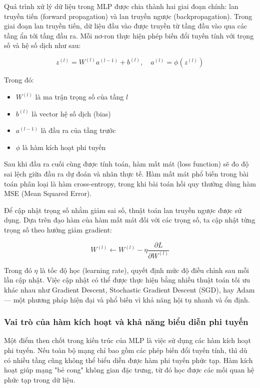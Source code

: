 Quá trình xử lý dữ liệu trong MLP được chia thành hai giai đoạn chính: lan truyền tiến (forward propagation) và lan truyền ngược (backpropagation). Trong giai đoạn lan truyền tiến, dữ liệu đầu vào được truyền từ tầng đầu vào qua các tầng ẩn tới tầng đầu ra. Mỗi nơ-ron thực hiện phép biến đổi tuyến tính với trọng số và hệ số dịch như sau:

\[
z^{(l)} = W^{(l)} a^{(l-1)} + b^{(l)}, \quad a^{(l)} = \phi(z^{(l)})
\]

Trong đó:
\begin{itemize}
	\item $W^{(l)}$ là ma trận trọng số của tầng $l$
	\item $b^{(l)}$ là vector hệ số dịch (bias)
	\item $a^{(l-1)}$ là đầu ra của tầng trước
	\item $\phi$ là hàm kích hoạt phi tuyến
\end{itemize}

Sau khi đầu ra cuối cùng được tính toán, hàm mất mát (loss function) sẽ đo độ sai lệch giữa đầu ra dự đoán và nhãn thực tế. Hàm mất mát phổ biến trong bài toán phân loại là hàm cross-entropy, trong khi bài toán hồi quy thường dùng hàm MSE (Mean Squared Error).

Để cập nhật trọng số nhằm giảm sai số, thuật toán lan truyền ngược được sử dụng. Dựa trên đạo hàm của hàm mất mát đối với các trọng số, ta cập nhật từng trọng số theo hướng giảm gradient:

\[
W^{(l)} \leftarrow W^{(l)} - \eta \frac{\partial L}{\partial W^{(l)}}
\]

Trong đó $\eta$ là tốc độ học (learning rate), quyết định mức độ điều chỉnh sau mỗi lần cập nhật. Việc cập nhật có thể được thực hiện bằng nhiều thuật toán tối ưu khác nhau như Gradient Descent, Stochastic Gradient Descent (SGD), hay Adam — một phương pháp hiện đại và phổ biến vì khả năng hội tụ nhanh và ổn định.

\subsubsection*{Vai trò của hàm kích hoạt và khả năng biểu diễn phi tuyến}

Một điểm then chốt trong kiến trúc của MLP là việc sử dụng các hàm kích hoạt phi tuyến. Nếu toàn bộ mạng chỉ bao gồm các phép biến đổi tuyến tính, thì dù có nhiều tầng cũng không thể biểu diễn được hàm phi tuyến phức tạp. Hàm kích hoạt giúp mạng "bẻ cong" không gian đặc trưng, từ đó học được các mối quan hệ phức tạp trong dữ liệu.


